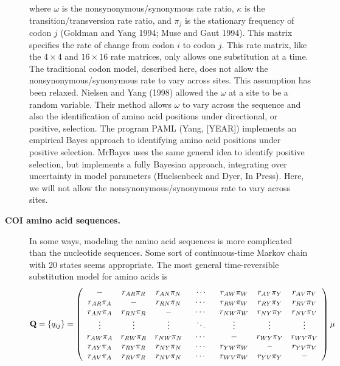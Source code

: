 \documentclass{svmult}
\begin{document}
\begin{description}
where $\omega$ is the nonsynonymous/synonymous rate ratio, $\kappa$ is the transition/transversion
rate ratio, and ${\pi}_j$ is the stationary frequency of codon $j$ (Goldman and Yang 1994; Muse and
Gaut 1994).  This matrix specifies the rate of change from codon $i$ to codon $j$. This rate
matrix, like the $4 \times 4$ and $16 \times 16$ rate matrices, only allows one substitution at a
time.\\

The traditional codon model, described here, does not allow the nonsynonymous/synonymous rate to
vary across sites. This assumption has been relaxed. Nielsen and Yang (1998) allowed the $\omega$
at a site to be a random variable. Their method allows $\omega$ to vary across the sequence and
also the identification of amino acid positions under directional, or positive, selection. The
program PAML (Yang, [YEAR]) implements an empirical Bayes approach to identifying amino acid
positions under positive selection. MrBayes uses the same general idea to identify positive
selection, but implements a fully Bayesian approach, integrating over uncertainty in model
parameters (Huelsenbeck and Dyer, In Press). Here, we will not allow the nonsynonymous/synonymous
rate to vary across sites. \\ 

\item[ {\bf COI amino acid sequences.}] In some ways, modeling the amino acid sequences is more
complicated than the nucleotide sequences.  Some sort of continuous-time Markov chain with 20
states seems appropriate. The most general time-reversible substitution model for amino acids
is
\begin{equation*}
{\mathbf Q} = \{q_{ij}\} = \left( \begin{array}{ccccccc}
-                       &  r_{AR} \pi_R  & r_{AN} \pi_N  & \hspace{0.1in} \cdots \hspace{0.1in} &  r_{AW} \pi_W &  r_{AY} \pi_Y &  r_{AV} \pi_V \\
r_{AR} \pi_A  &  -                       & r_{RN} \pi_N  & \cdots &  r_{RW} \pi_W &  r_{RY} \pi_Y &  r_{RV} \pi_V \\
r_{AN} \pi_A  &  r_{RN} \pi_R & -                        & \cdots &  r_{NW} \pi_W &  r_{NY} \pi_Y &  r_{NV} \pi_V \\
\vdots              & \vdots              & \vdots               & \ddots & \vdots               & \vdots             & \vdots              \\
r_{AW} \pi_A &  r_{RW} \pi_R & r_{NW} \pi_N & \cdots &  -                        &  r_{WY} \pi_Y &  r_{WV} \pi_V \\
r_{AY} \pi_A  &  r_{RY} \pi_R  & r_{NY} \pi_N  & \cdots &  r_{YW} \pi_W  &  -                      &  r_{YV} \pi_V \\
r_{AV} \pi_A  &  r_{RV} \pi_R  & r_{NV} \pi_N  & \cdots &  r_{WV} \pi_W  &  r_{YV} \pi_Y &  -                     \\
\end{array} \right) \mu
\end{equation*}


\end{description}
\end{document}
